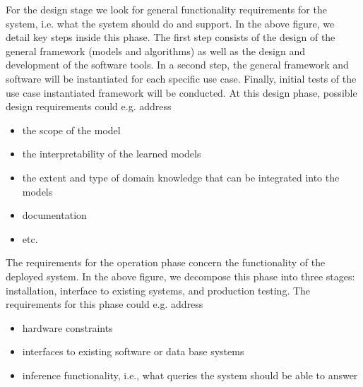 \documentclass[11pt, oneside]{article}   	%
\begin{document}
For the design stage we look for general functionality requirements for the system, i.e. what the system should do and support.  In the above figure, we detail key steps inside this phase. The first step consists of the design of the general framework (models and algorithms) as well as the design and development of the software tools. In a second step, the general framework and software will be instantiated for each specific use case. Finally, initial tests of the use case instantiated framework will be conducted.  
At this design phase, possible design requirements could e.g. address
\begin{itemize}
 \item the scope of the model
 \item the interpretability of the learned models
 \item the extent and type of domain knowledge that can be integrated into the models
 \item documentation
 \item etc. 
\end{itemize}
The requirements for the operation phase concern the functionality of the deployed system. In the above figure, we decompose this phase into three stages: installation, interface to existing systems, and production testing. The requirements for this phase could e.g. address
\begin{itemize}
 \item hardware constraints
 \item interfaces to existing software or data base systems
 \item inference functionality, i.e., what queries the system should be able to answer
\end{itemize}



\end{document}

